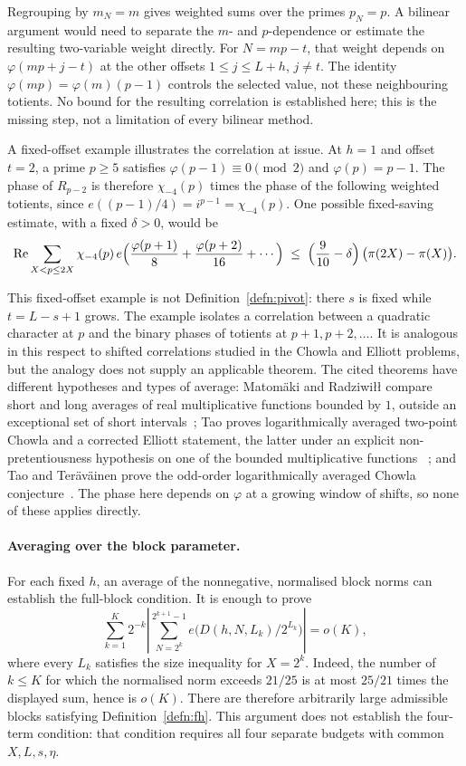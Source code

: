 \documentclass[11pt]{article}
\theoremstyle{plain}
\theoremstyle{definition}
\theoremstyle{remark}
\begin{document}
Regrouping by $m_N=m$ gives weighted sums over the primes $p_N=p$.
A bilinear argument would need to separate the $m$- and $p$-dependence or
estimate the resulting two-variable weight directly. For $N=mp-t$,
that weight depends on $\varphi(mp+j-t)$ at the other offsets
$1\le j\le L+h$, $j\ne t$. The identity
$\varphi(mp)=\varphi(m)(p-1)$ controls the selected value, not these
neighbouring totients. No bound for the resulting correlation is
established here; this is the missing step, not a limitation of every
bilinear method.

A fixed-offset example illustrates the correlation at issue. At $h=1$
and offset $t=2$, a prime $p\ge5$ satisfies $\varphi(p-1)\equiv0\pmod2$
and $\varphi(p)=p-1$. The phase of $R_{p-2}$ is therefore
$\chi_{-4}(p)$ times the phase of the following weighted totients, since
$e((p-1)/4)=i^{p-1}=\chi_{-4}(p)$. One possible fixed-saving estimate,
with a fixed $\delta>0$, would be
\[
  \operatorname{Re}\sum_{X<p\le 2X}\chi_{-4}(p)\,
    e\Bigl(\frac{\varphi(p+1)}{8}+\frac{\varphi(p+2)}{16}+\cdots\Bigr)
  \;\le\;\Bigl(\frac{9}{10}-\delta\Bigr)\,\bigl(\pi(2X)-\pi(X)\bigr).
\]

This fixed-offset example is not Definition~\ref{defn:pivot}: there $s$
is fixed while $t=L-s+1$ grows. The example isolates a correlation between
a quadratic character at $p$ and the binary phases of totients at
$p+1,p+2,\ldots$. It is analogous in this respect to shifted correlations
studied in the Chowla and Elliott problems, but the analogy does not
supply an applicable theorem. The cited theorems have different hypotheses and types of average: Matom\"aki and Radziwi\l{}\l{} compare short and long averages of
real multiplicative functions bounded by $1$, outside an exceptional set of
short intervals~\cite[Theorem~1]{matomaki-radziwill}; Tao proves logarithmically averaged two-point Chowla and a corrected
Elliott statement, the latter under an explicit non-pretentiousness
hypothesis on one of the bounded multiplicative functions
~\cite[Theorems~1.2--1.3]{tao-elliott}; and Tao and Ter\"av\"ainen
prove the odd-order logarithmically averaged Chowla
conjecture~\cite[Theorem~1.1]{tao-teravainen}. The phase here
depends on $\varphi$ at a growing window of shifts, so none of these applies
directly.

\paragraph{Averaging over the block parameter.}
For each fixed $h$, an average of the nonnegative, normalised block norms
can establish the full-block condition. It is enough to prove
\[
 \sum_{k=1}^{K}2^{-k}
 \left|\sum_{N=2^k}^{2^{k+1}-1}
       e\bigl(D(h,N,L_k)/2^{L_k}\bigr)\right|=o(K),
\]
where every $L_k$ satisfies the size inequality for $X=2^k$.
Indeed, the number of $k\le K$ for which the normalised norm exceeds
$21/25$ is at most $25/21$ times the displayed sum, hence is $o(K)$.
There are therefore arbitrarily large admissible blocks satisfying
Definition~\ref{defn:fh}. This argument does not establish the four-term
condition: that condition requires all four separate budgets with common
$X,L,s,\eta$.
\end{document}
